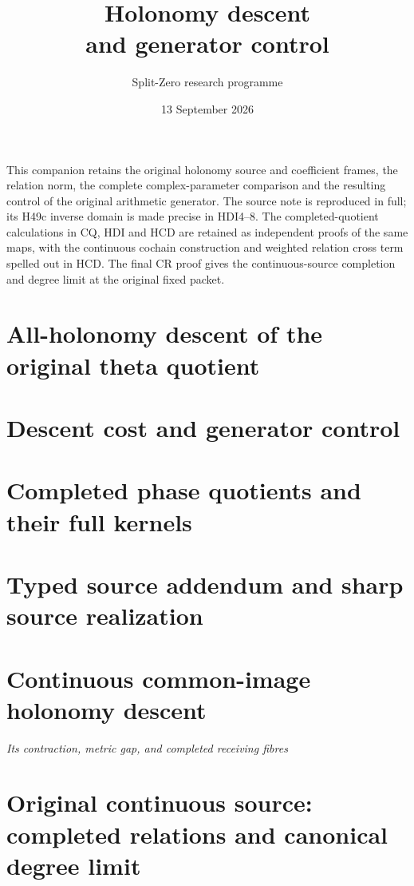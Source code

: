 \documentclass[11pt,a4paper]{article}
\title{Holonomy descent\\and generator control}
\author{Split-Zero research programme}
\date{13 September 2026}
\begin{document}
\maketitle
This companion retains the original holonomy source and coefficient frames,
the relation norm, the complete complex-parameter comparison and the
resulting control of the original arithmetic generator.
The source note is reproduced in full; its H49c inverse domain is made
precise in HDI4--8. The completed-quotient calculations in CQ, HDI and
HCD are retained as independent proofs of the same maps, with the
continuous cochain construction and weighted relation cross term
spelled out in HCD. The final CR proof gives the continuous-source
completion and degree limit at the original fixed packet.
\tableofcontents
\clearpage
\part{All-holonomy descent of the original theta quotient}

\clearpage
\part{Descent cost and generator control}

\clearpage

\clearpage
\part{Completed phase quotients and their full kernels}

\clearpage
\part{Typed source addendum and sharp source realization}

\clearpage
\part{Continuous common-image holonomy descent}
\noindent\textit{Its contraction, metric gap, and completed receiving fibres}

\clearpage
\part{Original continuous source: completed relations and canonical degree limit}\label{original-continuous-source-completed-relations-and-canonical-degree-limit}

\end{document}
